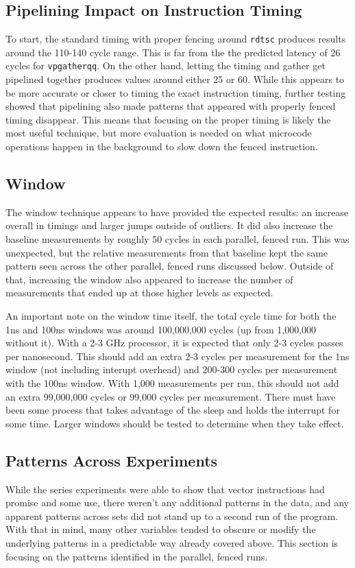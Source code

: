 \documentclass[article]{IEEEtran}
\begin{document}
\subsection{Pipelining Impact on Instruction Timing}
To start, the standard timing with proper fencing around \texttt{rdtsc} produces results around the 110-140 cycle range. This is far from the the predicted latency of 26 cycles for \texttt{vpgatherqq}\cite{intrinsics}. On the other hand, letting the timing and gather get pipelined together produces values around either 25 or 60. While this appears to be more accurate or closer to timing the exact instruction timing, further testing showed that pipelining also made patterns that appeared with properly fenced timing disappear. This means that focusing on the proper timing is likely the most useful technique, but more evaluation is needed on what microcode operations happen in the background to slow down the fenced instruction.

\subsection{Window}
The window technique appears to have provided the expected results: an increase overall in timings and larger jumps outside of outliers. It did also increase the baseline measurements by roughly 50 cycles in each parallel, fenced run. This was unexpected, but the relative measurements from that baseline kept the same pattern seen across the other parallel, fenced runs discussed below. Outside of that, increasing the window also appeared to increase the number of measurements that ended up at those higher levels as expected.

An important note on the window time itself, the total cycle time for both the 1ns and 100ns windows was around 100,000,000 cycles (up from 1,000,000 without it). With a 2-3 GHz processor, it is expected that only 2-3 cycles passes per nanosecond. This should add an extra 2-3 cycles per measurement for the 1ns window (not including interupt overhead) and 200-300 cycles per measurement with the 100ns window. With 1,000 measurements per run, this should not add an extra 99,000,000 cycles or 99,000 cycles per measurement. There must have been some process that takes advantage of the sleep and holds the interrupt for some time. Larger windows should be tested to determine when they take effect.

\subsection{Patterns Across Experiments}\label{sec:patterns}
While the series experiments were able to show that vector instructions had promise and some use, there weren't any additional patterns in the data, and any apparent patterns across sets did not stand up to a second run of the program. With that in mind, many other variables tended to obscure or modify the underlying patterns in a predictable way already covered above. This section is focusing on the patterns identified in the parallel, fenced runs.
\end{document}
